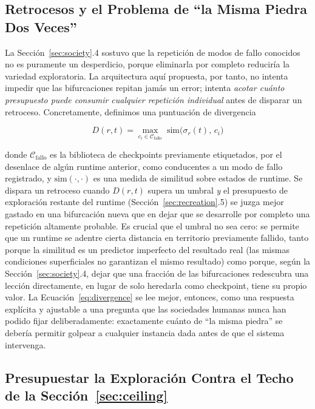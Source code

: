 \documentclass[11pt]{article}
\begin{document}
\subsection{Retrocesos y el Problema de ``la Misma Piedra Dos Veces''}

La Sección~\ref{sec:society}.4 sostuvo que la repetición de modos de fallo conocidos no es puramente un desperdicio, porque eliminarla por completo reduciría la variedad exploratoria. La arquitectura aquí propuesta, por tanto, no intenta impedir que las bifurcaciones repitan jamás un error; intenta \emph{acotar cuánto presupuesto puede consumir cualquier repetición individual} antes de disparar un retroceso. Concretamente, definimos una puntuación de divergencia

\begin{equation}
\label{eq:divergence}
D(r, t) = \max_{c_i \in \mathcal{C}_{\text{fallo}}} \; \mathrm{sim}\big(\sigma_r(t), \, c_i\big)
\end{equation}

\noindent donde $\mathcal{C}_{\text{fallo}}$ es la biblioteca de checkpoints previamente etiquetados, por el desenlace de algún runtime anterior, como conducentes a un modo de fallo registrado, y $\mathrm{sim}(\cdot,\cdot)$ es una medida de similitud sobre estados de runtime. Se dispara un retroceso cuando $D(r,t)$ supera un umbral \emph{y} el presupuesto de exploración restante del runtime (Sección~\ref{sec:recreation}.5) se juzga mejor gastado en una bifurcación nueva que en dejar que se desarrolle por completo una repetición altamente probable. Es crucial que el umbral no sea cero: se permite que un runtime se adentre cierta distancia en territorio previamente fallido, tanto porque la similitud es un predictor imperfecto del resultado real (las mismas condiciones superficiales no garantizan el mismo resultado) como porque, según la Sección~\ref{sec:society}.4, dejar que una fracción de las bifurcaciones redescubra una lección directamente, en lugar de solo heredarla como checkpoint, tiene su propio valor. La Ecuación~\ref{eq:divergence} se lee mejor, entonces, como una respuesta explícita y ajustable a una pregunta que las sociedades humanas nunca han podido fijar deliberadamente: exactamente cuánto de ``la misma piedra'' se debería permitir golpear a cualquier instancia dada antes de que el sistema intervenga.

\subsection{Presupuestar la Exploración Contra el Techo de la Sección~\ref{sec:ceiling}}
\end{document}
